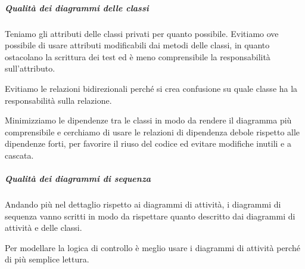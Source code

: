 		\subparagraph{Qualità dei diagrammi delle classi}
		Teniamo gli attributi delle classi privati per quanto possibile.
        Evitiamo ove possibile di usare attributi modificabili dai metodi delle classi, in quanto ostacolano la scrittura dei test ed è meno comprensibile la responsabilità sull'attributo.\par
        Evitiamo le relazioni bidirezionali perché si crea confusione su quale classe ha la responsabilità sulla relazione.\par
        Minimizziamo le dipendenze tra le classi in modo da rendere il diagramma più comprensibile e cerchiamo di usare le relazioni di dipendenza debole rispetto alle dipendenze forti, per favorire il riuso del codice ed evitare modifiche inutili e a cascata.


		\subparagraph{Qualità dei diagrammi di sequenza}
		Andando più nel dettaglio rispetto ai diagrammi di attività, i diagrammi di sequenza vanno scritti in modo da rispettare quanto descritto dai diagrammi di attività e delle classi.\par
        Per modellare la logica di controllo è meglio usare i diagrammi di attività perché di più semplice lettura.



